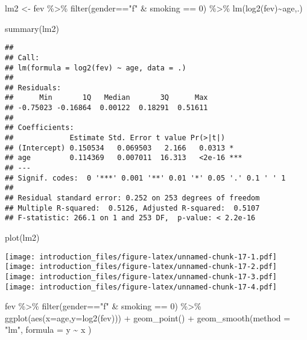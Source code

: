 \documentclass[
]{article}
\newenvironment{Shaded}{\begin{snugshade}}{\end{snugshade}}
\newcommand{\AttributeTok}[1]{\textcolor[rgb]{0.77,0.63,0.00}{#1}}
\newcommand{\DecValTok}[1]{\textcolor[rgb]{0.00,0.00,0.81}{#1}}
\newcommand{\FunctionTok}[1]{\textcolor[rgb]{0.00,0.00,0.00}{#1}}
\newcommand{\NormalTok}[1]{#1}
\newcommand{\OtherTok}[1]{\textcolor[rgb]{0.56,0.35,0.01}{#1}}
\newcommand{\SpecialCharTok}[1]{\textcolor[rgb]{0.00,0.00,0.00}{#1}}
\newcommand{\StringTok}[1]{\textcolor[rgb]{0.31,0.60,0.02}{#1}}
\begin{document}
\begin{Shaded}
\begin{Highlighting}[]
\NormalTok{lm2 }\OtherTok{\textless{}{-}}\NormalTok{ fev }\SpecialCharTok{\%\textgreater{}\%} 
  \FunctionTok{filter}\NormalTok{(gender}\SpecialCharTok{==}\StringTok{"f"} \SpecialCharTok{\&}\NormalTok{ smoking }\SpecialCharTok{==} \DecValTok{0}\NormalTok{) }\SpecialCharTok{\%\textgreater{}\%} 
  \FunctionTok{lm}\NormalTok{(}\FunctionTok{log2}\NormalTok{(fev)}\SpecialCharTok{\textasciitilde{}}\NormalTok{age,.)}

\FunctionTok{summary}\NormalTok{(lm2)}
\end{Highlighting}
\end{Shaded}

\begin{verbatim}
## 
## Call:
## lm(formula = log2(fev) ~ age, data = .)
## 
## Residuals:
##      Min       1Q   Median       3Q      Max 
## -0.75023 -0.16864  0.00122  0.18291  0.51611 
## 
## Coefficients:
##             Estimate Std. Error t value Pr(>|t|)    
## (Intercept) 0.150534   0.069503   2.166   0.0313 *  
## age         0.114369   0.007011  16.313   <2e-16 ***
## ---
## Signif. codes:  0 '***' 0.001 '**' 0.01 '*' 0.05 '.' 0.1 ' ' 1
## 
## Residual standard error: 0.252 on 253 degrees of freedom
## Multiple R-squared:  0.5126, Adjusted R-squared:  0.5107 
## F-statistic: 266.1 on 1 and 253 DF,  p-value: < 2.2e-16
\end{verbatim}

\begin{Shaded}
\begin{Highlighting}[]
\FunctionTok{plot}\NormalTok{(lm2)}
\end{Highlighting}
\end{Shaded}

\texttt{[image: introduction\_files/figure-latex/unnamed-chunk-17-1.pdf]}
\texttt{[image: introduction\_files/figure-latex/unnamed-chunk-17-2.pdf]}
\texttt{[image: introduction\_files/figure-latex/unnamed-chunk-17-3.pdf]}
\texttt{[image: introduction\_files/figure-latex/unnamed-chunk-17-4.pdf]}

\begin{Shaded}
\begin{Highlighting}[]
\NormalTok{fev }\SpecialCharTok{\%\textgreater{}\%} 
  \FunctionTok{filter}\NormalTok{(gender}\SpecialCharTok{==}\StringTok{"f"} \SpecialCharTok{\&}\NormalTok{ smoking }\SpecialCharTok{==} \DecValTok{0}\NormalTok{) }\SpecialCharTok{\%\textgreater{}\%} 
  \FunctionTok{ggplot}\NormalTok{(}\FunctionTok{aes}\NormalTok{(}\AttributeTok{x=}\NormalTok{age,}\AttributeTok{y=}\FunctionTok{log2}\NormalTok{(fev))) }\SpecialCharTok{+} 
  \FunctionTok{geom\_point}\NormalTok{() }\SpecialCharTok{+}
  \FunctionTok{geom\_smooth}\NormalTok{(}\AttributeTok{method =} \StringTok{"lm"}\NormalTok{, }\AttributeTok{formula =}\NormalTok{ y }\SpecialCharTok{\textasciitilde{}}\NormalTok{ x )}
\end{Highlighting}
\end{Shaded}
\end{document}

